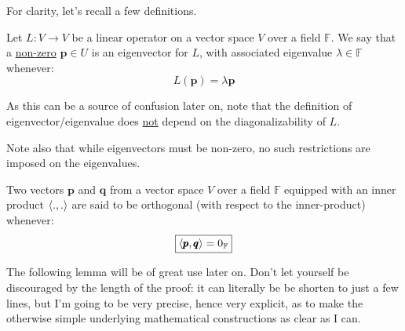 \documentclass[solutions.tex]{subfiles}
\renewcommand{\bm}[1]{\pmb{#1}}
\begin{document}
For clarity, let's recall a few definitions.

\begin{definition} Let $L : V \rightarrow V$ be a linear operator
on a vector space $V$ over a field $\mathbb{F}$.
We say that a \underline{non-zero} $\bm{p}\in U$ is an eigenvector for $L$,
with associated eigenvalue $\lambda\in\mathbb{F}$ whenever:
\[
	L(\bm{p}) = \lambda\bm{p}
\]
\end{definition}

\begin{remark} As this can be a source of confusion later on, note
that the definition of eigenvector/eigenvalue does \underline{not}
depend on the diagonalizability of $L$.
\end{remark}

\begin{remark} Note also that while eigenvectors must be
non-zero, no such restrictions are imposed on the eigenvalues.
\end{remark}

\begin{definition} Two vectors $\bm{p}$ and $\bm{q}$ from
a vector space $V$ over a field $\mathbb{F}$ equipped with
an inner product $\left\langle . , . \right\rangle$ are said to be orthogonal
(with respect to the inner-product) whenever:
\[
	\boxed{\innerprod{\bm{p}}{\bm{q}} = 0_{\mathbb{F}}}
\]
\end{definition}

The following lemma will be of great use later on. Don't
let yourself be discouraged by the length of the proof: it can
literally be be shorten to just a few lines, but I'm going to
be very precise, hence very explicit, as to make the otherwise
simple underlying mathematical constructions as clear as I can.
\end{document}
